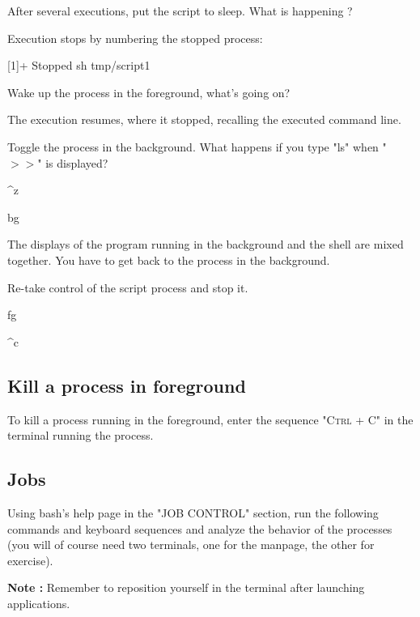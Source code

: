 \documentclass[11pt]{article}
\begin{document}
After several executions, put the script to sleep. What is happening ?


\begin{solution}
	Execution stops by numbering the stopped process:
	
	[1]+  Stopped                 sh tmp/script1
\end{solution}

Wake up the process in the foreground, what's going on?

\begin{solution}
	The execution resumes, where it stopped, recalling the executed command line.
\end{solution}

Toggle the process in the background. What happens if you type "ls" when  "$ >> $" is displayed?

\begin{solution}
	
	\^{}z
	
	bg
	
	The displays of the program running in the background and the shell are mixed together. You have to get back to the process in the background.
	
\end{solution}

Re-take control of the script process and stop it.

\begin{solution}
	
	fg
	
	\^{}c
\end{solution}

\subsection{Kill a process in foreground}

To kill a process running in the foreground, enter the sequence \textsc{"Ctrl + C"} in the terminal running the process.

\subsection{Jobs}

Using bash's help page in the "JOB CONTROL" section, run the following commands and keyboard sequences and analyze the behavior of the processes (you will of course need two terminals, one for the manpage, the other for exercise).

\noindent \textbf{Note :} Remember to reposition yourself in the terminal after launching applications.
\end{document}
